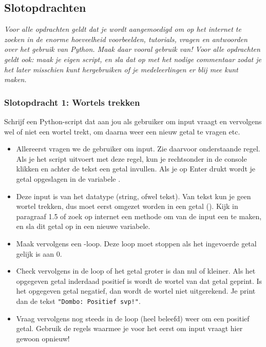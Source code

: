 \documentclass[a4paper,11pt, fleqn]{article}
\begin{document}
\subsection{Slotopdrachten}
{\it Voor alle opdrachten geldt dat je wordt aangemoedigd om op het internet te zoeken in de enorme hoeveelheid voorbeelden, tutorials, vragen en antwoorden over het gebruik van Python. Maak daar vooral gebruik van! Voor alle opdrachten geldt ook: maak je eigen script, en sla dat op met het nodige commentaar zodat je het later misschien kunt hergebruiken of je medeleerlingen er blij mee kunt maken.}

\subsubsection{Slotopdracht 1: Wortels trekken} 

Schrijf een Python-script dat aan jou als gebruiker om input vraagt en vervolgens wel of niet een wortel trekt, om daarna weer een nieuw getal te vragen etc.

\begin{itemize}
	\item Allereerst vragen we de gebruiker om input. Zie daarvoor onderstaande regel. Als je het script uitvoert met deze regel, kun je rechtsonder in de console klikken en achter de tekst een getal invullen. Als je op Enter drukt wordt je getal opgeslagen in de variabele .
	\item Deze input is van het datatype  (string, ofwel tekst). Van tekst kun je geen wortel trekken, dus moet  eerst omgezet worden in een getal (). Kijk in paragraaf 1.5 of zoek op internet een methode om van de input een  te maken, en sla dit getal op in een nieuwe variabele.
	\item Maak vervolgens een -loop. Deze loop moet stoppen als het ingevoerde getal gelijk is aan 0.
	\item Check vervolgens in de loop of het getal groter is dan nul of kleiner. Als het opgegeven getal inderdaad positief is wordt de wortel van dat getal geprint. Is het opgegeven getal negatief, dan wordt de wortel niet uitgerekend. Je print dan de tekst \verb."Dombo: Positief svp!"..
	\item Vraag vervolgens nog steeds in de loop (heel beleefd) weer om een positief getal. Gebruik de regels waarmee je voor het eerst om input vraagt hier gewoon opnieuw!
\end{itemize}
\end{document}
